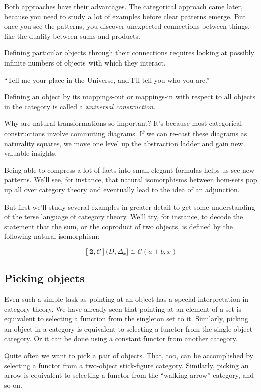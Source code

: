 \documentclass[DaoFP]{subfiles}
\begin{document}
Both approaches have their advantages. The categorical approach came later, because you need to study a lot of examples before clear patterns emerge. But once you see the patterns, you discover unexpected connections between things, like the duality between sums and products.

Defining particular objects through their connections requires looking at possibly infinite numbers of objects with which they interact. 

``Tell me your place in the Universe, and I'll tell you who you are.''

Defining an object by its mappings-out or mappings-in with respect to all objects in the category is called a \emph{universal construction}. 

Why are natural transformations so important? It's because most categorical constructions involve commuting diagrams. If we can re-cast these diagrams as naturality squares, we move one level up the abstraction ladder and gain new valuable insights.

Being able to compress a lot of facts into small elegant formulas helps us see new patterns. We'll see, for instance, that natural isomorphisms between hom-sets pop up all over category theory and eventually lead to the idea of an adjunction.

But first we'll study several examples in greater detail to get some understanding of the terse language of category theory. We'll try, for instance, to decode the statement that the sum, or the coproduct of two objects, is defined by the following natural isomorphism:

\[ [\mathbf{2}, \mathcal{C}](D, \Delta_x]  \cong \mathcal{C}(a + b, x) \]



\subsection{Picking objects}

Even such a simple task as pointing at an object has a special interpretation in category theory. We have already seen that pointing at an element of a set is equivalent to selecting a function from the singleton set to it. Similarly, picking an object in a category is equivalent to selecting a functor from the single-object category. Or it can be done using a constant functor from another category. 

Quite often we want to pick a pair of objects. That, too, can be accomplished by selecting a functor from a two-object stick-figure category. Similarly, picking an arrow is equivalent to selecting a functor from the ``walking arrow'' category, and so on.
\end{document}
